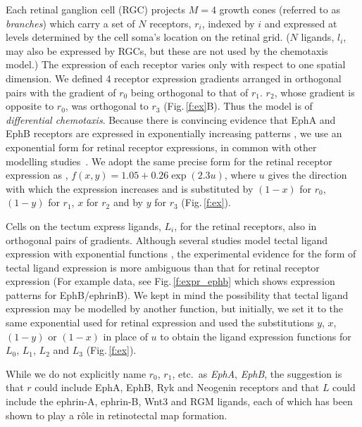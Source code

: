 \documentclass[11pt, a4paper]{article}
\begin{document}
Each retinal ganglion cell (RGC) projects $M=4$ growth cones (referred to as \emph{branches}) which carry a set of $N$ receptors, $r_i$, indexed by $i$ and expressed at levels determined by the cell soma's location on the retinal grid. 
($N$ ligands, $l_i$, may also be expressed by RGCs, but these are not used by the chemotaxis model.) 
The expression of each receptor varies only with respect to one spatial dimension.
%
We defined 4 receptor expression gradients arranged in orthogonal pairs with the gradient of $r_0$ being orthogonal to that of $r_1$. $r_2$, whose gradient is opposite to $r_0$, was orthogonal to $r_3$ (Fig.\,\ref{f:ex}B). Thus the model is of \emph{differential chemotaxis}.
%
Because there is convincing evidence that EphA and EphB receptors are expressed in exponentially increasing patterns \citep{reber_relative_2004,feldheim_genetic_2000,brown_topographic_2000,koulakov_stochastic_2004}, we use an exponential form for retinal receptor expressions, in common with other modelling studies~\citep{reber_relative_2004,koulakov_stochastic_2004,simpson_simple_2011}.
We adopt the same precise form for the retinal receptor expression as \citet{simpson_simple_2011}, $f(x,y) = 1.05 + 0.26 \exp(2.3 u)$, where $u$ gives the direction with which the expression increases and is substituted by $(1-x)$ for $r_0$, $(1-y)$ for $r_1$, $x$ for $r_2$ and by $y$ for $r_3$ (Fig.\,\ref{f:ex}).

Cells on the tectum express ligands, $L_i$, for the retinal receptors, also in orthogonal pairs of gradients.
Although several studies model tectal ligand expression with exponential functions \citep{koulakov_stochastic_2004}, the experimental evidence for the form of tectal ligand expression is more ambiguous than that for retinal receptor expression (For example data, see Fig.\,\ref{f:expr_ephb} which shows expression patterns for EphB/ephrinB). 
We kept in mind the possibility that tectal ligand expression may be modelled by another function, but initially, we set it to the same exponential used for retinal expression and used the substitutions $y$, $x$, $(1-y)$ or $(1-x)$ in place of $u$ to obtain the ligand expression functions for $L_0$, $L_1$, $L_2$ and $L_3$ (Fig.\,\ref{f:ex}).

While we do not explicitly name $r_0$, $r_1$, etc.~as \emph{EphA}, \emph{EphB}, the suggestion is that $r$ could include EphA, EphB, Ryk \citep{schmitt_wntryk_2006} and Neogenin \citep{rajagopalan_neogenin_2004} receptors and that $L$ could include the ephrin-A, ephrin-B, Wnt3 \citep{schmitt_wntryk_2006} and RGM \citep{monnier_rgm_2002} ligands, each of which has been shown to play a r\^ole in retinotectal map formation.
\end{document}
